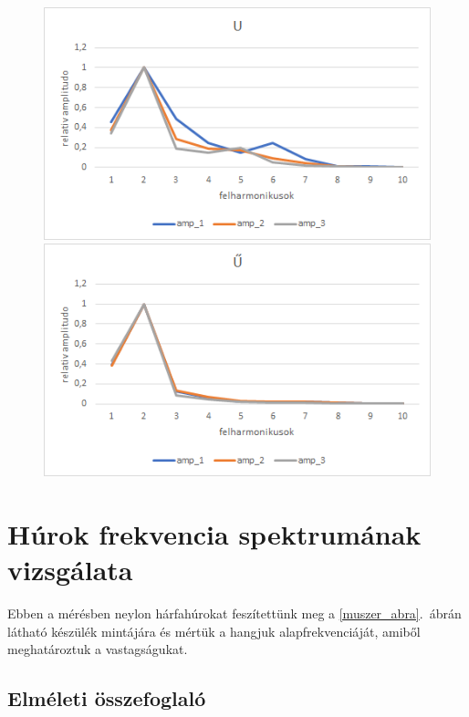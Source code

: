 \documentclass[a4paper,12pt]{article}
\begin{document}
\begin{figure}[h!]
\centering
\begin{minipage}{.5\textwidth}
  \centering
  \includegraphics[width=.9\linewidth]{U.png}
\end{minipage}%
\begin{minipage}{.5\textwidth}
  \centering
  \includegraphics[width=.9\linewidth]{U_1.png}
\end{minipage}
\end{figure}




\section{Húrok frekvencia spektrumának vizsgálata}

Ebben a mérésben neylon hárfahúrokat feszítettünk meg a \ref{muszer_abra}.\ ábrán látható készülék mintájára és mértük a hangjuk alapfrekvenciáját, amiből meghatároztuk a vastagságukat.

\subsection{Elméleti összefoglaló}
\end{document}
